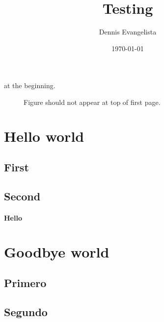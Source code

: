 \documentclass{article}
\title{Testing}
\author{Dennis Evangelista}
\date{\today}
\begin{document}
\maketitle

 at the beginning. %

\begin{figure}[h]
\caption{Figure should not appear at top of first page.} %
\end{figure}

\section{Hello world}
\lipsum[1][1]

\subsection{First}
\lipsum[1][2]

\subsection{Second}
\lipsum[1][3]

\paragraph{Hello} \lipsum[1][4]

\section{Goodbye world}
\lipsum[2][1]

\subsection{Primero}
\lipsum[2][2]

\subsection{Segundo}
\lipsum[2][3]
\end{document}
